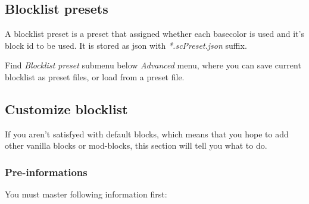 \documentclass{article}
\begin{document}
\subsection{Blocklist presets}
A blocklist preset is a preset that assigned whether each basecolor is used and it's block id to be used. It is stored as json with \textit{*.scPreset.json} suffix.

Find \textit{Blocklist preset} submenu below \textit{Advanced} menu, where you can save current blocklist as preset files, or load from a preset file.

\subsection{Customize blocklist}
If you aren't satisfyed with default blocks, which means that you hope to add other vanilla blocks or mod-blocks, this section will tell you what to do.

\subsubsection{Pre-informations}
You must master following information first:
\end{document}
